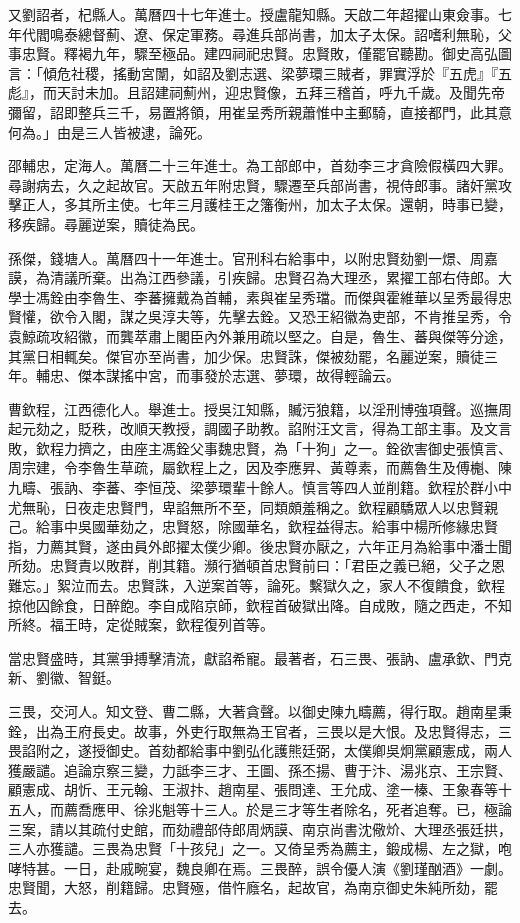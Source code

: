 \begin{pinyinscope}
又劉詔者，杞縣人。萬曆四十七年進士。授盧龍知縣。天啟二年超擢山東僉事。七年代閻鳴泰總督薊、遼、保定軍務。尋進兵部尚書，加太子太保。詔嗜利無恥，父事忠賢。釋褐九年，驟至極品。建四祠祀忠賢。忠賢敗，僅罷官聽勘。御史高弘圖言：「傾危社稷，搖動宮闈，如詔及劉志選、梁夢環三賊者，罪實浮於『五虎』『五彪』，而天討未加。且詔建祠薊州，迎忠賢像，五拜三稽首，呼九千歲。及聞先帝彌留，詔即整兵三千，易置將領，用崔呈秀所親蕭惟中主郵騎，直接都門，此其意何為。」由是三人皆被逮，論死。

邵輔忠，定海人。萬曆二十三年進士。為工部郎中，首劾李三才貪險假橫四大罪。尋謝病去，久之起故官。天啟五年附忠賢，驟遷至兵部尚書，視侍郎事。諸奸黨攻擊正人，多其所主使。七年三月護桂王之籓衡州，加太子太保。還朝，時事已變，移疾歸。尋麗逆案，贖徒為民。

孫傑，錢塘人。萬曆四十一年進士。官刑科右給事中，以附忠賢劾劉一燝、周嘉謨，為清議所棄。出為江西參議，引疾歸。忠賢召為大理丞，累擢工部右侍郎。大學士馮銓由李魯生、李蕃擁戴為首輔，素與崔呈秀璫。而傑與霍維華以呈秀最得忠賢懽，欲令入閣，謀之吳淳夫等，先擊去銓。又恐王紹徽為吏部，不肯推呈秀，令袁鯨疏攻紹徽，而龔萃肅上閣臣內外兼用疏以堅之。自是，魯生、蕃與傑等分途，其黨日相輒矣。傑官亦至尚書，加少保。忠賢誅，傑被劾罷，名麗逆案，贖徒三年。輔忠、傑本謀搖中宮，而事發於志選、夢環，故得輕論云。

曹欽程，江西德化人。舉進士。授吳江知縣，贓污狼籍，以淫刑博強項聲。巡撫周起元劾之，貶秩，改順天教授，調國子助教。諂附汪文言，得為工部主事。及文言敗，欽程力擠之，由座主馮銓父事魏忠賢，為「十狗」之一。銓欲害御史張慎言、周宗建，令李魯生草疏，屬欽程上之，因及李應昇、黃尊素，而薦魯生及傅櫆、陳九疇、張訥、李蕃、李恒茂、梁夢環輩十餘人。慎言等四人並削籍。欽程於群小中尤無恥，日夜走忠賢門，卑諂無所不至，同類頗羞稱之。欽程顧驕眾人以忠賢親己。給事中吳國華劾之，忠賢怒，除國華名，欽程益得志。給事中楊所修緣忠賢指，力薦其賢，遂由員外郎擢太僕少卿。後忠賢亦厭之，六年正月為給事中潘士聞所劾。忠賢責以敗群，削其籍。瀕行猶頓首忠賢前曰：「君臣之義已絕，父子之恩難忘。」絮泣而去。忠賢誅，入逆案首等，論死。繫獄久之，家人不復饋食，欽程掠他囚餘食，日醉飽。李自成陷京師，欽程首破獄出降。自成敗，隨之西走，不知所終。福王時，定從賊案，欽程復列首等。

當忠賢盛時，其黨爭搏擊清流，獻諂希寵。最著者，石三畏、張訥、盧承欽、門克新、劉徽、智鋌。

三畏，交河人。知文登、曹二縣，大著貪聲。以御史陳九疇薦，得行取。趙南星秉銓，出為王府長史。故事，外吏行取無為王官者，三畏以是大恨。及忠賢得志，三畏諂附之，遂授御史。首劾都給事中劉弘化護熊廷弼，太僕卿吳炯黨顧憲成，兩人獲嚴譴。追論京察三變，力詆李三才、王圖、孫丕揚、曹于汴、湯兆京、王宗賢、顧憲成、胡忻、王元翰、王淑抃、趙南星、張問達、王允成、塗一榛、王象春等十五人，而薦喬應甲、徐兆魁等十三人。於是三才等生者除名，死者追奪。已，極論三案，請以其疏付史館，而劾禮部侍郎周炳謨、南京尚書沈儆炌、大理丞張廷拱，三人亦獲譴。三畏為忠賢「十孩兒」之一。又倚呈秀為薦主，鍛成楊、左之獄，咆哮特甚。一日，赴戚畹宴，魏良卿在焉。三畏醉，誤令優人演《劉瑾酗酒》一劇。忠賢聞，大怒，削籍歸。忠賢殛，借忤廕名，起故官，為南京御史朱純所劾，罷去。


\end{pinyinscope}

